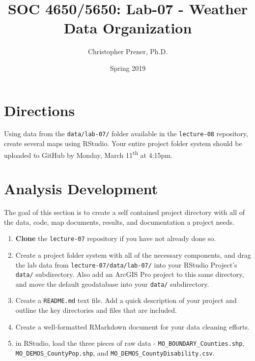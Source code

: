 \documentclass{tufte-handout}
\title{SOC 4650/5650: Lab-07 - Weather Data Organization}
\author{Christopher Prener, Ph.D.}
\date{Spring 2019}
\begin{document}
\maketitle %

\section{Directions}
Using data from the \texttt{data/lab-07/} folder available in the \texttt{lecture-08} repository, create several maps using RStudio. Your entire project folder system should be uploaded to GitHub by Monday, March 11\textsuperscript{th} at 4:15pm.

\vspace{5mm}
\section{Analysis Development}
The goal of this section is to create a self contained project directory with all of the data, code, map documents, results, and documentation a project needs.

\begin{enumerate}[label=\alph*.]
\item \textbf{Clone} the \texttt{lecture-07} repository if you have not already done so.
\item Create a project folder system with all of the necessary components, and drag the lab data from \texttt{lecture-07/data/lab-07/} into your RStudio Project's \texttt{data/} subdirectory. Also add an ArcGIS Pro project to this same directory, and move the default geodatabase into your \texttt{data/} subdirectory.
\item Create a \texttt{README.md} text file. Add a quick description of your project and outline the key directories and files that are included. 
\item Create a well-formatted RMarkdown document for your data cleaning efforts.
\item in RStudio, load the three pieces of raw data - \texttt{MO\_BOUNDARY\_Counties.shp}, \texttt{MO\_DEMOS\_CountyPop.shp}, and \texttt{MO\_DEMOS\_CountyDisability.csv}. 
\end{enumerate}

\vspace{5mm}
\end{document}
